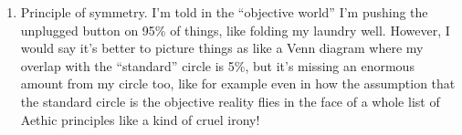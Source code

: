 \begin{itemize}
\begin{enumerate}
\item Principle of symmetry. I'm told in the ``objective world'' I'm pushing the unplugged button on 95\% of things, like folding my laundry well. However, I would say it's better to picture things as like a Venn diagram where my overlap with the ``standard'' circle is 5\%, but it's missing an enormous amount from my circle too, like for example even in how the assumption that the standard circle is the objective reality flies in the face of a whole list of Aethic principles like a kind of cruel irony!
\end{enumerate}

\end{itemize}
